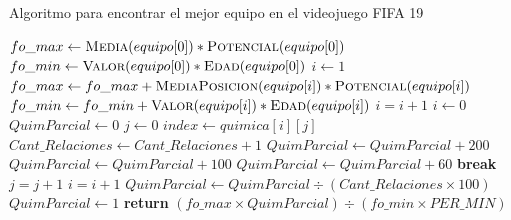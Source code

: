 \documentclass{article}
\begin{document}
\renewcommand{\thealgorithm}{}
\begin{algorithm}[H]
    \caption{Algoritmo para encontrar el mejor equipo en el videojuego FIFA 19} 
    \begin{algorithmic}[1]
         
            \State $fo\_max \gets \Call{Media}{equipo[0]} * \Call{Potencial}{equipo[0]}$
            \State $fo\_min \gets \Call{Valor}{equipo[0]} * \Call{Edad}{equipo[0]}$
            \State $i \gets 1$
                \State $fo\_max \gets fo\_max + \Call{MediaPosicion}{equipo[i]} * \Call{Potencial}{equipo[i]}$
                \State $fo\_min \gets fo\_min + \Call{Valor}{equipo[i]} * \Call{Edad}{equipo[i]}$
                \State $i = i+1$
            \EndWhile
            \State $i \gets 0$
            \State $QuimParcial \gets 0$
                \State $j \gets 0$
                        \State $index \gets quimica[i][j]$
                        \State $Cant\_Relaciones \gets Cant\_Relaciones + 1$
                                \State $QuimParcial \gets QuimParcial + 200$
                            \Else 
                                    \State $QuimParcial \gets QuimParcial + 100$
                                \Else
                                    \State $QuimParcial \gets QuimParcial + 60$
                            \EndIf
                        \EndIf
                    \Else
                    \State \textbf{break }
                    \EndIf
                    \State $j = j+1$
                \EndWhile
                \State $i = i+1$
            \EndWhile
            \State $QuimParcial \gets QuimParcial \div (Cant\_Relaciones \times 100)$
            \State $QuimParcial \gets 1$
            \EndIf
            \State \textbf{return }{$(fo\_max \times QuimParcial) \div (fo\_min \times PER\_MIN)$}
        \EndProcedure
    \end{algorithmic}
\end{algorithm}
\end{document}
